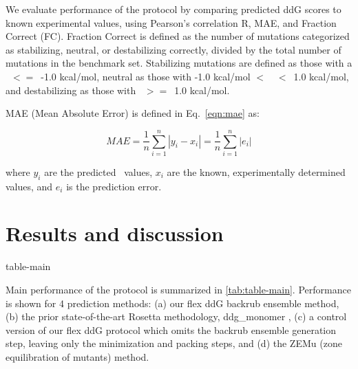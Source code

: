 We evaluate performance of the protocol by comparing predicted ddG scores to known experimental values, using Pearson's correlation R, MAE, and Fraction Correct (FC). Fraction Correct is defined as the number of mutations categorized as stabilizing, neutral, or destabilizing correctly, divided by the total number of mutations in the benchmark set. Stabilizing mutations are defined as those with a \ddg\ $<=$\ -1.0 kcal/mol, neutral as those with -1.0 kcal/mol $<$\ \ddg\ $<$\ 1.0 kcal/mol, and destabilizing as those with \ddg\ $>=$\ 1.0 kcal/mol.

MAE (Mean Absolute Error) is defined in Eq.~\ref{eqn:mae} as:

\begin{equation}\label{eqn:mae}
  MAE = \dfrac{1}{n}\sum\limits_{i=1}^n|y_i-x_i| = \dfrac{1}{n}\sum\limits_{i=1}^n|e_i|
\end{equation}

where $y_i$ are the predicted \ddg\ values, $x_i$ are the known, experimentally determined values, and $e_i$ is the prediction error.

\section{Results and discussion}

{table-main}

Main performance of the protocol is summarized in \cref{tab:table-main}. Performance is shown for 4 prediction methods: (a) our flex ddG backrub ensemble method, (b) the prior state-of-the-art Rosetta methodology, ddg\_monomer \cite{kellogg_role_2011}, (c) a control version of our flex ddG protocol which omits the backrub ensemble generation step, leaving only the minimization and packing steps, and (d) the ZEMu (zone equilibration of mutants) method\cite{dourado_multiscale_2014}.

